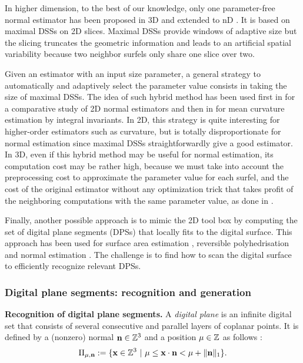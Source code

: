 In higher dimension, to the best of our knowledge, only one parameter-free normal estimator
has been proposed in 3D \cite{Lenoir1996,Tellier1999} and extended to nD \cite{Lachaud2003}.
It is based on maximal DSSs on 2D slices. Maximal DSSs provide windows of adaptive size
but the slicing truncates the geometric information and leads to
an artificial spatial variability because two neighbor surfels only
share one slice over two. 

Given an estimator with an input size parameter, a general strategy to automatically and adaptively select
the parameter value consists in taking the size of maximal DSSs. 
The idea of such hybrid method has been used first in \cite{Devieilleville2009}
for a comparative study of 2D normal estimators and then in \cite{Coeurjolly2014IIfree}
for mean curvature estimation by integral invariants.
In 2D, this strategy is quite interesting for higher-order estimators such as curvature,
but is totally disproportionate for normal estimation since maximal DSSs straightforwardly give a good estimator. 
In 3D, even if this hybrid method may be useful for normal estimation, its computation cost may be rather high,
because we must take into account the preprocessing cost to approximate the parameter value for each surfel,
and the cost of the original estimator without any optimization trick that takes profit of the neighboring
computations with the same parameter value, as done in \cite{Lachaud2017}. 

Finally, another possible approach is to mimic the 2D tool box by computing the set of
digital plane segments (DPSs) that locally fits to the digital surface. This approach
has been used for surface area estimation \cite{Klette2001}, reversible polyhedrisation
\cite{Sivignon2004} and normal estimation \cite{Charrier2011}.
The challenge is to find how to scan the digital surface to efficiently recognize relevant DPSs. 

\subsubsection{Digital plane segments: recognition and generation}

\noindent\textbf{Recognition of digital plane segments.}
A \emph{digital plane} is an infinite digital set that 
consists of several consecutive and parallel layers of coplanar points. 
It is defined by a (nonzero) normal $\mathbf{n} \in {\ensuremath\mathbb{Z}}^3$ and a position $\mu \in {\ensuremath\mathbb{Z}}$ as follows
\cite{reveilles1991}:  
\begin{equation}
  \label{eq:plane}
\Pi_{\mu,\mathbf{n}} := \{ \mathbf{x} \in {\ensuremath\mathbb{Z}}^3 \ | \ \mu \leq \mathbf{x} \cdot \mathbf{n} < \mu + \|\mathbf{n}\|_1 \}.
\end{equation}

